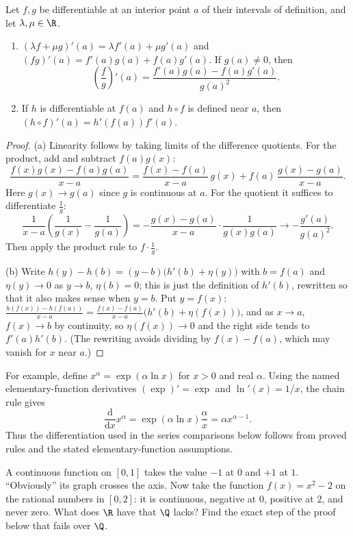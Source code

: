 \begin{proposition}\label{prop:early-differentiation}
Let $f,g$ be differentiable at an interior point $a$ of their intervals of
definition, and let $\lambda,\mu\in\R$.
\begin{enumerate}[label=(\alph*)]
\item $(\lambda f+\mu g)'(a)=\lambda f'(a)+\mu g'(a)$ and
$(fg)'(a)=f'(a)g(a)+f(a)g'(a)$. If $g(a)\ne0$, then
\[
\left(\frac fg\right)'(a)=\frac{f'(a)g(a)-f(a)g'(a)}{g(a)^2}.
\]
\item If $h$ is differentiable at $f(a)$ and $h\circ f$ is defined near $a$,
then $(h\circ f)'(a)=h'(f(a))f'(a)$.
\end{enumerate}
\end{proposition}
\begin{proof}
(a) Linearity follows by taking limits of the difference quotients. For the product, add and subtract $f(a)g(x)$:
\[
\frac{f(x)g(x)-f(a)g(a)}{x-a}=\frac{f(x)-f(a)}{x-a}\,g(x)+f(a)\,\frac{g(x)-g(a)}{x-a}.
\]
Here $g(x)\to g(a)$ since $g$ is continuous at $a$. For the quotient it suffices to differentiate $\frac1g$:
\[
\frac1{x-a}\left(\frac1{g(x)}-\frac1{g(a)}\right)=-\frac{g(x)-g(a)}{x-a}\cdot\frac1{g(x)g(a)}\to-\frac{g'(a)}{g(a)^2}.
\]
Then apply the product rule to $f\cdot\frac1g$.

(b) Write $h(y)-h(b)=(y-b)\bigl(h'(b)+\eta(y)\bigr)$ with $b=f(a)$ and $\eta(y)\to0$ as $y\to b$, $\eta(b)=0$; this is just the definition of $h'(b)$, rewritten so that it also makes sense when $y=b$. Put $y=f(x)$:
$\frac{h(f(x))-h(f(a))}{x-a}=\frac{f(x)-f(a)}{x-a}\bigl(h'(b)+\eta(f(x))\bigr)$, and as $x\to a$, $f(x)\to b$ by continuity, so $\eta(f(x))\to0$ and the right side tends to $f'(a)h'(b)$. (The rewriting avoids dividing by $f(x)-f(a)$, which may vanish for $x$ near $a$.)
\end{proof}

For example, define $x^\alpha=\exp(\alpha\ln x)$ for $x>0$ and real $\alpha$.
Using the named elementary-function derivatives $(\exp)'=\exp$ and
$\ln'(x)=1/x$, the chain rule gives
\[
\frac{\mathrm d}{\mathrm dx}x^\alpha
=\exp(\alpha\ln x)\frac\alpha x=\alpha x^{\alpha-1}.
\]
Thus the differentiation used in the series comparisons below follows from
proved rules and the stated elementary-function assumptions.

\begin{think}
A continuous function on $[0,1]$ takes the value $-1$ at $0$ and $+1$ at $1$. ``Obviously'' its graph crosses the axis. Now take the function
$f(x)=x^2-2$ on the rational numbers in $[0,2]$: it is continuous, negative at $0$, positive at $2$, and never zero. What does $\R$ have that $\Q$ lacks? Find the exact step of the proof below that fails over $\Q$.
\end{think}

